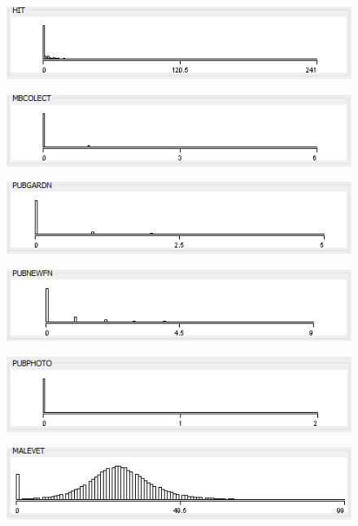 \begin{figure}
\includegraphics{./images/expl_rep/Cattura-03-06}
\end{figure}
\begin{figure}
\includegraphics{./images/expl_rep/Cattura-03-07}
\end{figure}
\begin{figure}
\includegraphics{./images/expl_rep/Cattura-03-08}
\end{figure}
\begin{figure}
\includegraphics{./images/expl_rep/Cattura-03-09}
\end{figure}
\begin{figure}
\includegraphics{./images/expl_rep/Cattura2-00-00}
\end{figure}
\begin{figure}
\includegraphics{./images/expl_rep/Cattura2-00-01}
\end{figure}
